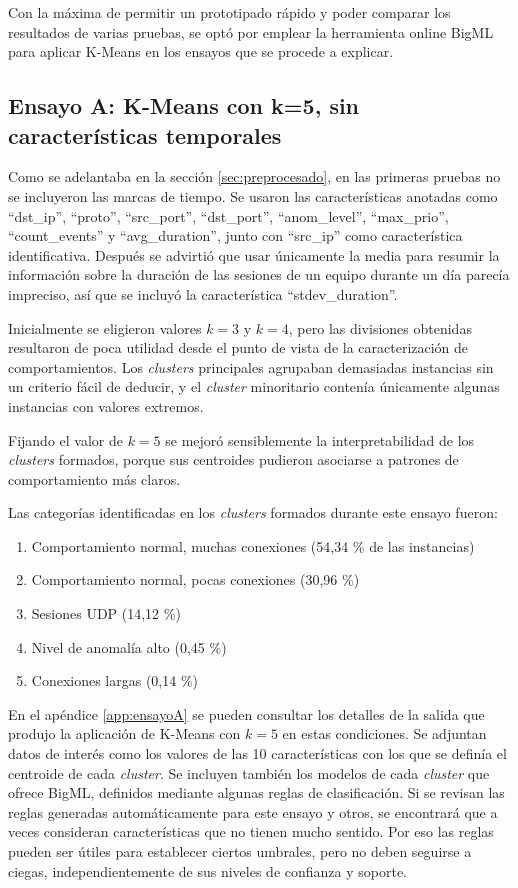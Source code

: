 Con la máxima de permitir un prototipado rápido y poder comparar los resultados de varias pruebas,
se optó por emplear la herramienta online BigML para aplicar K-Means en los ensayos que se procede a explicar.

\subsection{Ensayo A: K-Means con k=5, sin características temporales}\label{subsec:ensayoA}

Como se adelantaba en la sección \ref{sec:preprocesado}, en las primeras pruebas no se incluyeron las marcas de tiempo.
Se usaron las características anotadas como ``dst\_ip'', ``proto'', ``src\_port'', ``dst\_port'', ``anom\_level'', ``max\_prio'', ``count\_events'' y ``avg\_duration'',
junto con ``src\_ip'' como característica identificativa.
Después se advirtió que usar únicamente la media para resumir la información sobre la duración de las sesiones de un equipo durante un día parecía impreciso,
así que se incluyó la característica ``stdev\_duration''.

Inicialmente se eligieron valores $k=3$ y $k=4$, pero las divisiones obtenidas resultaron de poca utilidad desde el punto de vista de la caracterización de comportamientos.
Los \emph{clusters} principales agrupaban demasiadas instancias sin un criterio fácil de deducir, y el \emph{cluster} minoritario contenía únicamente algunas instancias con valores extremos.

Fijando el valor de $k=5$ se mejoró sensiblemente la interpretabilidad de los \emph{clusters} formados,
porque sus centroides pudieron asociarse a patrones de comportamiento más claros.

Las categorías identificadas en los \emph{clusters} formados durante este ensayo fueron:
\begin{enumerate}
    \item Comportamiento normal, muchas conexiones (54,34 \% de las instancias)
    \item Comportamiento normal, pocas conexiones (30,96 \%)
    \item Sesiones UDP (14,12 \%)
    \item Nivel de anomalía alto (0,45 \%)
    \item Conexiones largas (0,14 \%)
\end{enumerate}

En el apéndice \ref{app:ensayoA} se pueden consultar los detalles de la salida que produjo la aplicación de K-Means con $k=5$ en estas condiciones.
Se adjuntan datos de interés como los valores de las 10 características con los que se definía el centroide de cada \emph{cluster}.
Se incluyen también los modelos de cada \emph{cluster} que ofrece BigML, definidos mediante algunas reglas de clasificación.
Si se revisan las reglas generadas automáticamente para este ensayo y otros, se encontrará que a veces consideran características que no tienen mucho sentido.
Por eso las reglas pueden ser útiles para establecer ciertos umbrales, pero no deben seguirse a ciegas, independientemente de sus niveles de confianza y soporte.

